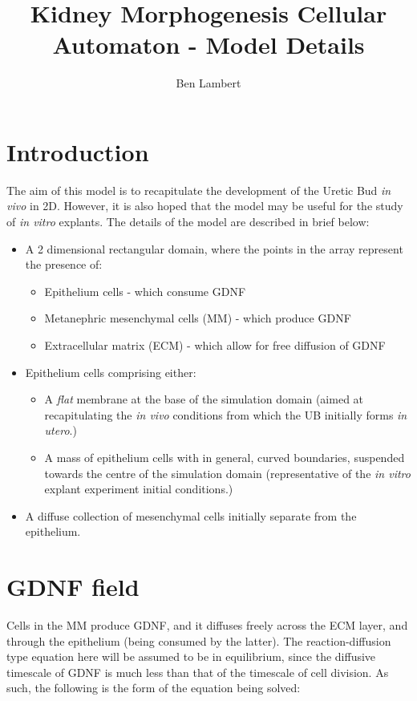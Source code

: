 \documentclass[pdftex,10pt,a4paper]{article}
\title{\textbf{Kidney Morphogenesis Cellular Automaton - Model Details}\newline }
\author{Ben Lambert}
\begin{document}
\maketitle
\doublespacing
\section{Introduction}
The aim of this model is to recapitulate the development of the Uretic Bud \textit{in vivo} in 2D. However, it is also hoped that the model may be useful for the study of \textit{in vitro} explants. The details of the model are described in brief below:
\begin{itemize}
\item A 2 dimensional rectangular domain, where the points in the array represent the presence of:
\begin{itemize}
\item Epithelium cells - which consume GDNF
\item Metanephric mesenchymal cells (MM) - which produce GDNF
\item Extracellular matrix (ECM) - which allow for free diffusion of GDNF
\end{itemize}
\item Epithelium cells comprising either:
\begin{itemize}
\item A \textit{flat} membrane at the base of the simulation domain (aimed at recapitulating the \textit{in vivo} conditions from which the UB initially forms \textit{in utero}.)
\item A mass of epithelium cells with in general, curved boundaries, suspended towards the centre of the simulation domain (representative of the \textit{in vitro} explant experiment initial conditions.)
\end{itemize}
\item A diffuse collection of mesenchymal cells initially separate from the epithelium.
\end{itemize}

\section{GDNF field}
Cells in the MM produce GDNF, and it diffuses freely across the ECM layer, and through the epithelium (being consumed by the latter). The reaction-diffusion type equation here will be assumed to be in equilibrium, since the diffusive timescale of GDNF is much less than that of the timescale of cell division. As such, the following is the form of the equation being solved:
\end{document}

